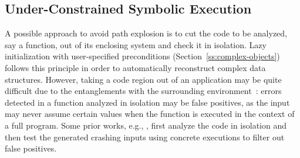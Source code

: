 \subsection{Under-Constrained Symbolic Execution} 
\label{under-constrained}

A possible approach to avoid path explosion is to cut the code to be analyzed, say a function, out of its enclosing system and check it in isolation. Lazy initialization with user-specified preconditions (Section~\ref{ss:complex-objects}) follows this principle in order to automatically reconstruct complex  data structures. However, taking a code region out of an application may be quite difficult due to the entanglements with the surrounding environment~\cite{ED-ISSTA07}: errors detected in a function analyzed in isolation may be false positives, as the input may never assume certain values when the function is executed in the context of a full program. Some prior works, e.g., \cite{CS-ICSE05}, first analyze the code in isolation and then test the generated crashing inputs using concrete executions to filter out false positives.


